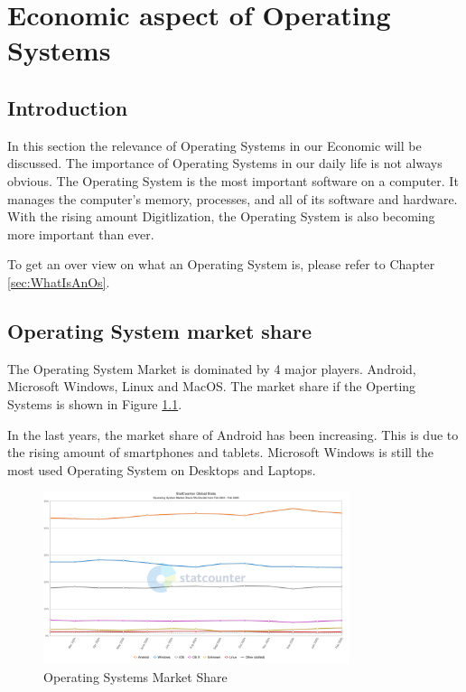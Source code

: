 \chapter{Economic aspect of Operating Systems }
\label{chap:Economic_aspekt_of_Operating_Systems}


\section{Introduction}

In this section the relevance of Operating Systems in our Economic will be discussed. The importance of Operating Systems in our daily life is not always obvious.
The Operating System is the most important software on a computer. It manages the computer's memory, processes, and all of its software and hardware. 
With the rising amount Digitlization, the Operating System is also becoming more important than ever.

To get an over view on what an Operating System is, please refer to Chapter \ref{sec:WhatIsAnOs}.


\section{Operating System market share}

The Operating System Market is dominated by 4 major players. Android, Microsoft Windows, Linux and MacOS.
The market share if the Operting Systems is shown in Figure \ref{fig:Operating_Systems_Market_Share}. 

In the last years, the market share of Android has been increasing. This is due to the rising amount of smartphones and tablets.
Microsoft Windows is still the most used Operating System on Desktops and Laptops.

\begin{figure}[H]
    \centering
    \includegraphics[width=0.8\textwidth]{figures/StatCounter-os_combined-ww-monthly-202402-202502.png}
    \caption{Operating Systems Market Share}
    \label{fig:Operating_Systems_Market_Share}
\end{figure}
\cite{OsMarketShare2}

